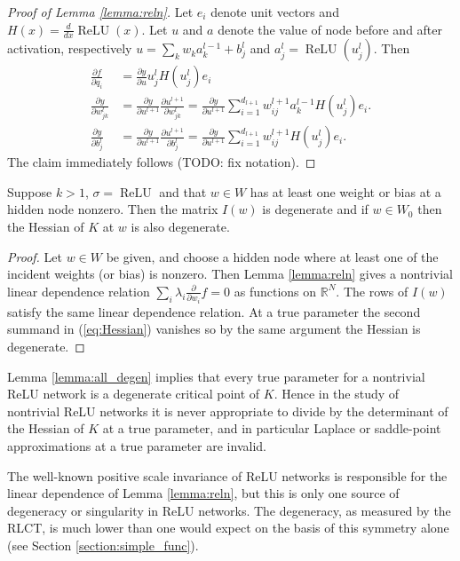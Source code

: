 \documentclass{article} %
\begin{document}
\begin{proof}[Proof of Lemma \ref{lemma:reln}]
	Let $e_i$ denote unit vectors and $H(x)=\frac{d}{dx}\operatorname{ReLU}(x)$. Let $u$ and $a$ denote the value of node before and after activation, respectively $u =\sum_k w_k a_{k}^{l-1}+b_{j}^{l}$ and $a_{j}^{l} =\operatorname{ReLU}(u_{j}^{l})$. Then
	\begin{align*}
	\frac{\partial f}{\partial q_i}&=\frac{\partial y}{\partial u}u_{j}^{l}H(u_{j}^{l})e_{i}\\
	\frac{\partial y}{\partial w_{jk}^{l}}&=\frac{\partial y}{\partial u^{l+1}}\frac{\partial u^{l+1}}{\partial w_{jk}^{l}}=\frac{\partial y}{\partial u^{l+1}}\sum_{i=1}^{d_{l+1}}w_{ij}^{l+1}a_{k}^{l-1}H(u_{j}^{l})e_{i}.\\
	\frac{\partial y}{\partial b_{j}^{l}}&=\frac{\partial y}{\partial u^{l+1}}\frac{\partial u^{l+1}}{\partial b_{j}^{l}}=\frac{\partial y}{\partial u^{l+1}}\sum_{i=1}^{d_{l+1}}w_{ij}^{l+1}H(u_{j}^{l})e_{i}.
	\end{align*}
	The claim immediately follows (TODO: fix notation).
\end{proof}

\begin{lemma}\label{lemma:all_degen} Suppose $k > 1$, $\sigma = \operatorname{ReLU}$ and that $w \in W$ has at least one weight or bias at a hidden node nonzero. Then the matrix $I(w)$ is degenerate and if $w \in W_0$ then the Hessian of $K$ at $w$ is also degenerate.
\end{lemma}
\begin{proof}
	Let $w \in W$ be given, and choose a hidden node where at least one of the incident weights (or bias) is nonzero. Then Lemma \ref{lemma:reln} gives a nontrivial linear dependence relation $\sum_i \lambda_i \frac{\partial}{\partial w_i} f = 0$ as functions on $\mathbb{R}^N$. The rows of $I(w)$ satisfy the same linear dependence relation. At a true parameter the second summand in (\ref{eq:Hessian}) vanishes so by the same argument the Hessian is degenerate.
\end{proof}

Lemma \ref{lemma:all_degen} implies that every true parameter for a nontrivial ReLU network is a degenerate critical point of $K$. Hence in the study of nontrivial ReLU networks it is never appropriate to divide by the determinant of the Hessian of $K$ at a true parameter, and in particular Laplace or saddle-point approximations at a true parameter are invalid.

The well-known positive scale invariance of ReLU networks is responsible for the linear dependence of Lemma \ref{lemma:reln}, but this is only one source of degeneracy or singularity in ReLU networks. The degeneracy, as measured by the RLCT, is much lower than one would expect on the basis of this symmetry alone (see Section \ref{section:simple_func}).
\end{document}
